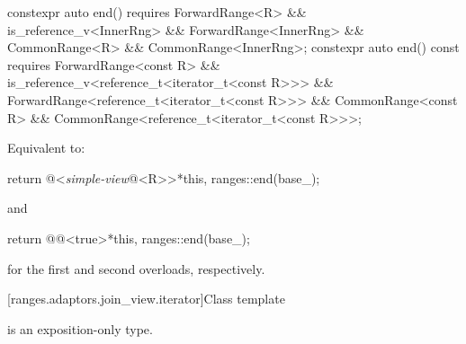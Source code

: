%
\begin{itemdecl}
constexpr auto end() requires ForwardRange<R> &&
  is_reference_v<InnerRng> && ForwardRange<InnerRng> &&
  CommonRange<R> && CommonRange<InnerRng>;
constexpr auto end() const requires ForwardRange<const R> &&
  is_reference_v<reference_t<iterator_t<const R>>> &&
  ForwardRange<reference_t<iterator_t<const R>>> &&
  CommonRange<const R> && CommonRange<reference_t<iterator_t<const R>>>;
\end{itemdecl}

\begin{itemdescr}
\pnum
\effects Equivalent to:
\begin{codeblock}
return @<\textit{simple-view}@<R>>{*this, ranges::end(base_)};
\end{codeblock}
and
\begin{codeblock}
return @@<true>{*this, ranges::end(base_)};
\end{codeblock}
for the first and second overloads, respectively.
\end{itemdescr}

[ranges.adaptors.join_view.iterator]{Class template }

\pnum
{} is an exposition-only type.

